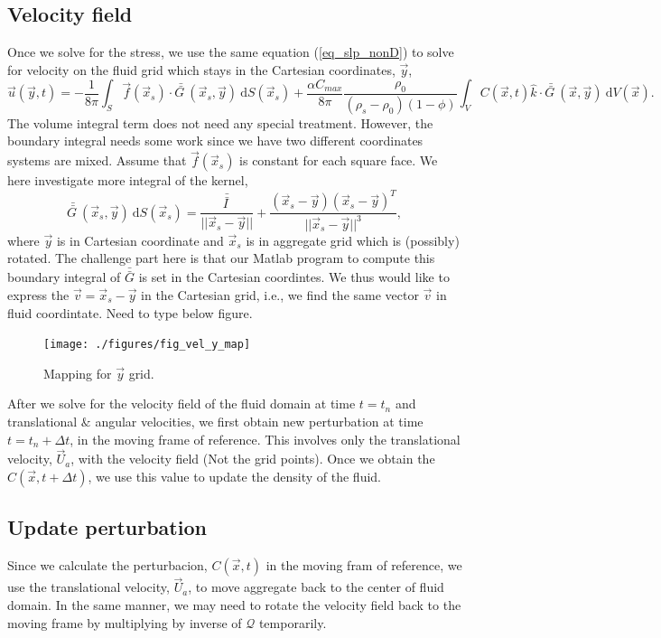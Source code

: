 \subsection{Velocity field}
Once we solve for the stress, we use the same 
equation (\ref{eq_slp_nonD}) 
to solve for velocity on the fluid grid which stays in the Cartesian coordinates, 
$\vec{y}$,
\begin{equation}
	\vec{u} \left(\vec{y},t\right) 
		  =- \frac{1}{8 \pi} \int_{S}  
		 \vec{f}(\vec{x}_s) 
		 \cdot \bar{\bar{G \ }} (\vec{x}_s,\vec{y}) 
		 \ \textrm{d}S(\vec{x}_s) 
		 + \frac{ \alpha C_{max}}{8\pi } \frac{\rho_0}{(\rho_s - \rho_0)(1-\phi)}
		 \int_V  C \left(\vec{x} ,t \right) \hat{k} \cdot
		 \bar{\bar{G \ }}(\vec{x}, \vec{y} )
		 \ \text{d}V(\vec{x}).
\end{equation}
The volume integral term does not need any special treatment. 
However, the boundary integral needs some work
since we have two different coordinates systems are mixed.
Assume that $\vec{f}(\vec{x}_s)$ is constant for each square face. 
We here investigate more integral of the kernel,
\[
	\bar{\bar{G \ }} (\vec{x}_s,\vec{y}) 
		 \ \textrm{d}S(\vec{x}_s)
	= 
	\frac{\bar{\bar{I \ }}}{||\vec{x}_s-\vec{y} ||} 
	+ \frac{(\vec{x}_s-\vec{y})(\vec{x}_s-\vec{y})^T}{||\vec{x}_s-\vec{y} ||^3}, 	 
\]
where $\vec{y}$ is in Cartesian coordinate 
and $\vec{x}_s$ is in aggregate grid which is (possibly) rotated. 
The challenge part here is that 
our Matlab program to compute this boundary integral of $\bar{\bar{G}}$
is set in the Cartesian coordintes. 
We thus would like to express the $\vec{v} = \vec{x}_s - \vec{y}$ 
in the Cartesian grid, i.e., we find the same vector $\vec{v}$ in fluid coordintate.
{\color{blue} Need to type below figure.}
\begin{figure}[h]
	\begin{center}
		\texttt{[image: ./figures/fig\_vel\_y\_map]}		
		\caption{Mapping for $\vec{y}$ grid.}
		\label{fig_vel_y_map}
\end{center}
\end{figure}

After we solve for the velocity field of the fluid domain at time $t = t_n$ and translational $\&$ angular velocities, we first obtain new perturbation at time $t = t_n + \Delta t$, in the moving frame of reference. This involves only the translational velocity,     $\vec{U}_a$, with the velocity field (Not the grid points). 
Once we obtain the $C(\vec{x}, t+\Delta t) $, we use this value to update the density of the fluid.
%
\subsection{Update perturbation}
Since we calculate the perturbacion, $C(\vec{x},t)$ in the moving fram of reference, 
we use the translational velocity, $\vec{U}_a$, to move aggregate back to the center of 
fluid domain.
In the same manner, we may need to rotate the velocity field back to the moving frame 
by multiplying by inverse of $\mathcal{Q}$ temporarily. 
\clearpage
